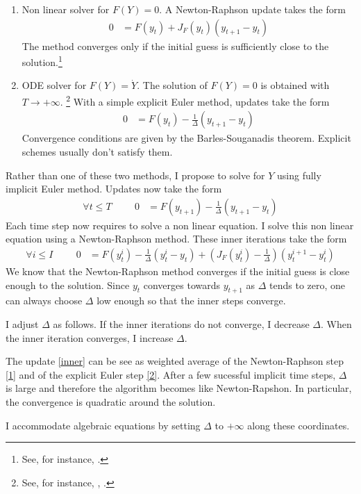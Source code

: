 \documentclass[english]{article}
\begin{document}
	\begin{enumerate}
		\item Non linear solver for $F (Y ) = 0$. A Newton-Raphson update takes the form
		\begin{align}\label{1}
			0 &= F(y_{t}) + J_{F}(y_t) (y_{t+1} - y_t)
		\end{align}
		The method converges only if the initial guess is sufficiently close to the solution.\footnote{See, for instance, \citet{campbell1999force}.}
		\item ODE solver for $F(Y) = \dot{Y}$. The solution of $F(Y)=0$ is obtained with $T\rightarrow +\infty$. \footnote{See, for instance, \citet{ditellabalance}, \citet{silva2015risk}.}
		With a simple explicit Euler method, updates take the form
		\begin{align}\label{2}
			0&= F(y_t) - \frac{1}{\Delta} (y_{t+1} -y_{t})
		\end{align}
		Convergence conditions are given by the Barles-Souganadis theorem. Explicit schemes usually don't satisfy them.
	\end{enumerate}
	Rather than one of these two methods, I propose to solve for $Y$ using fully implicit Euler method.  Updates now take the form 
	\begin{align*}
		\forall t \leq T \hspace{1cm} 0&= F(y_{t+1}) - \frac{1}{\Delta}(y_{t+1} -y_{t})
	\end{align*}
	Each time step now requires to solve a non linear equation. I solve this non linear equation using a Newton-Raphson method. These inner iterations take the form
	\begin{align}\label{inner}
		\forall i \leq I \hspace{1cm}	0 &= F(y_{t}^i) - \frac{1}{\Delta}(y_{t}^{i} -y_{t}) + (J_{F}(y_t^i) -  \frac{1}{\Delta})(y^{i+1}_{t} - y_t^i)
	\end{align}
	We know that the Newton-Raphson method converges if the initial guess is close enough to the solution. Since $y_{t}$ converges towards $y_{t+1}$ as $\Delta$ tends to zero, one can always choose $\Delta$ low enough so that the inner steps converge.\par
	I adjust $\Delta$ as follows. If the inner iterations do not converge, I decrease $\Delta$. When the inner iteration converges, I increase $\Delta$. \par
	The update \cref{inner} can be see as weighted average of the Newton-Raphson step \cref{1} and of the explicit Euler step \cref{2}.  After a few sucessful implicit time steps, $\Delta$ is large and therefore the algorithm becomes like Newton-Rapshon. In particular, the convergence is quadratic around the solution. \par
	I accommodate algebraic equations by setting $\Delta$ to $+\infty$ along these coordinates.
\end{document}
